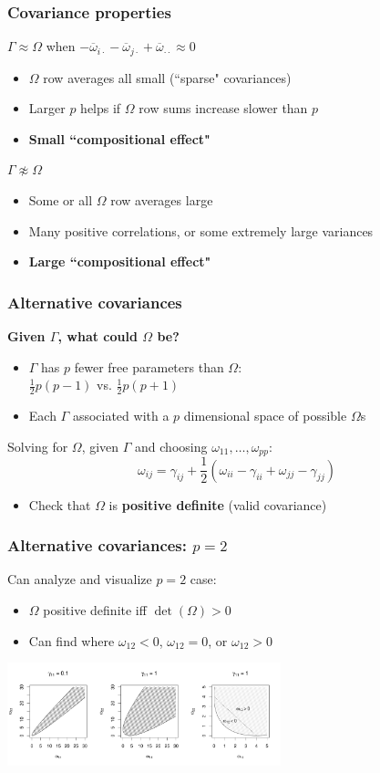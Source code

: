 \documentclass{beamer}
\begin{document}
\begin{frame}
\frametitle{Covariance properties}
$\Gamma \approx \Omega$ when $-\overline{\omega}_{i\cdot} - \overline{\omega}_{j\cdot} + \overline{\omega}_{\cdot\cdot} \approx 0$
\begin{itemize}
\item $\Omega$ row averages all small (``sparse" covariances)
\item Larger $p$ helps if $\Omega$ row sums increase slower than $p$
\item \textbf{Small ``compositional effect"}
\end{itemize}
\pause
$\Gamma \not\approx \Omega$
\begin{itemize}
\item Some or all $\Omega$ row averages large
\item Many positive correlations, or some extremely large variances
\item \textbf{Large ``compositional effect"}
\end{itemize}
\end{frame}

\begin{frame}
\frametitle{Alternative covariances}
\textbf{Given $\Gamma$, what could $\Omega$ be?}
\begin{itemize}
\item $\Gamma$ has $p$ fewer free parameters than $\Omega$: \\$\frac{1}{2}p(p-1)$ vs. $\frac{1}{2}p(p+1)$
\item Each $\Gamma$ associated with a $p$ dimensional space of possible $\Omega$s
\end{itemize}
\pause
Solving for $\Omega$, given $\Gamma$ and choosing $\omega_{11}, \dots, \omega_{pp}$:
\begin{equation*}
\omega_{ij} = \gamma_{ij} + \frac{1}{2}(\omega_{ii} - \gamma_{ii} + \omega_{jj} - \gamma_{jj})
\end{equation*}
\pause
\begin{itemize}
\item Check that $\Omega$ is \textbf{positive definite} (valid covariance)
\end{itemize}
\end{frame}

\begin{frame}
\frametitle{Alternative covariances: $p = 2$}
Can analyze and visualize $p = 2$ case:
\begin{itemize}
\item $\Omega$ positive definite iff $\det(\Omega) > 0$
\item Can find where $\omega_{12} < 0$, $\omega_{12} = 0$, or $\omega_{12} > 0$
\end{itemize}
\pause
\begin{center}
\includegraphics[width=300px]{figs/regions-2.pdf}
\end{center}
\end{frame}
\end{document}
